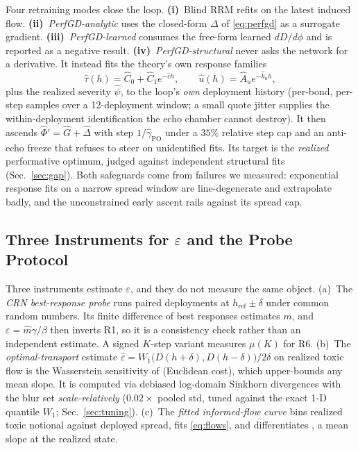 \documentclass[sigconf,anonymous,review]{acmart}
\newcommand{\eps}{\varepsilon}
\newcommand{\gPO}{\gamma_{\mathrm{PO}}}
\newcommand{\hRef}{h_{\mathrm{ref}}}  %
\newcommand{\Wone}{W_1}
\begin{document}
Four retraining modes close the loop. \textbf{(i)}~Blind RRM refits on the
latest induced flow. \textbf{(ii)}~\emph{PerfGD-analytic} uses the
closed-form $\Delta$ of \eqref{eq:perfgd} as a surrogate gradient.
\textbf{(iii)}~\emph{PerfGD-learned} consumes the free-form learned
$dD/d\phi$ and is reported as a negative result.
\textbf{(iv)}~\emph{PerfGD-structural} never asks the network for a
derivative. It instead fits the theory's own response families
\begin{equation}
\hat\tau(h)=\hat C_0+\hat C_1 e^{-\hat c h},\qquad
\hat u(h)=\hat A_u e^{-\hat k_u h},
\label{eq:structfit}
\end{equation}
plus the realized severity $\hat\psi$, to the loop's \emph{own} deployment
history (per-bond, per-step samples over a 12-deployment window; a small
quote jitter supplies the within-deployment identification the echo chamber
cannot destroy). It then ascends $\hat\Phi'=\hat G+\hat\Delta$ with step
$1/\hat\gPO$ under a $35\%$ relative step cap and an anti-echo
freeze that refuses to steer on unidentified fits. Its target is the
\emph{realized} performative optimum, judged against independent structural
fits (Sec.~\ref{sec:gap}). Both safeguards come from
failures we measured: exponential response fits on a narrow spread window are
line-degenerate and extrapolate badly, and the unconstrained early ascent
rails against its spread cap.

\subsection{Three Instruments for $\eps$ and the Probe Protocol}
\label{sec:instruments}
Three instruments estimate $\eps$, and they do not measure the same object.
(a)~The \emph{CRN best-response probe} runs paired deployments at
$\hRef\pm\delta$ under common random numbers. Its finite difference of best
responses estimates $m$, and $\eps=\hat m\gamma/\beta$ then inverts R1, so it
is a consistency check rather than an independent estimate. A signed $K$-step
variant measures $\mu(K)$ for R6. (b)~The \emph{optimal-transport} estimate
$\hat\eps=\Wone\big(D(h{+}\delta),D(h{-}\delta)\big)/2\delta$ on realized
toxic flow is the Wasserstein sensitivity of
\cite{perdomo2020performative} (Euclidean cost), which upper-bounds any mean
slope. It is computed via debiased log-domain Sinkhorn divergences
\cite{cuturi2013sinkhorn,feydy2019interpolating} with the blur set
\emph{scale-relatively} ($0.02\times$ pooled std, tuned against the exact 1-D
quantile $\Wone$; Sec.~\ref{sec:tuning}). (c)~The \emph{fitted informed-flow
curve} bins realized toxic notional against deployed spread, fits
\eqref{eq:flows}, and differentiates \cite{cont2014price}, a mean slope at
the realized state.
\end{document}
